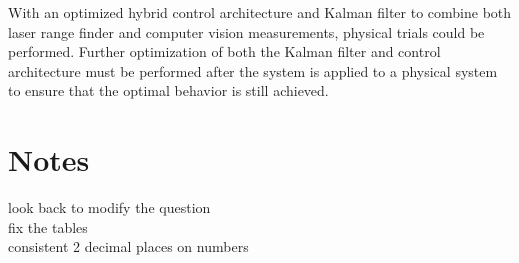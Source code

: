 \documentclass[journal, 10pt]{IEEEtran}
\begin{document}
With an optimized hybrid control architecture and Kalman filter to combine both laser range finder and computer vision measurements, physical trials could be performed.  Further optimization of both the Kalman filter and control architecture must be performed after the system is applied to a physical system to ensure that the optimal behavior is still achieved.

\section{Notes}
look back to modify the question \\
fix the tables \\
consistent 2 decimal places on numbers
\nocite{*}

{}
\end{document}
